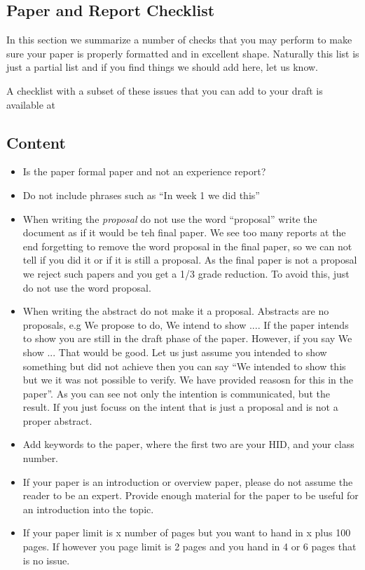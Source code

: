 \subsection{Paper and Report Checklist}\label{paper-checklist}

In this section we summarize a number of checks that you may perform to
make sure your paper is properly formatted and in excellent shape.
Naturally this list is just a partial list and if you find things we
should add here, let us know.

A checklist with a subset of these issues that you can add to your draft is available at


\subsection{Content}

\begin{itemize}[label=$\Box$]
    \item Is the paper formal paper and not an experience report? 
    \item Do not include phrases such as ``In week 1 we did this''
    \item When writing the {\em proposal} do not use the word ``proposal''
      write the document as if it would be teh final paper. We see too
      many reports at the end forgetting to remove the word proposal
      in the final paper, so we can not tell if you did it or if it is
      still a proposal. As the final paper is not a proposal we reject
      such papers and you get a 1/3 grade reduction. To avoid this,
      just do not use the word proposal.
    \item When writing the abstract do not make it a
      proposal. Abstracts are no proposals, e.g We propose to do, We
      intend to show .... If the paper intends to show you are still
      in the draft phase of the paper. However, if you say We show
      ... That would be good. Let us just assume you intended to show
      something but did not achieve then you can say ``We intended to
      show this but we it was not possible to verify. We have provided
      reasosn for this in the paper''. As you can see not only the
      intention is communicated, but the result. If you just focuss on
      the intent that is just a proposal and is not a proper abstract.
    \item Add keywords to the paper, where the first two are your HID,
      and your class number.
    \item If your paper is an introduction or overview paper, please
      do not assume the reader to be an expert. Provide enough
      material for the paper to be useful for an introduction into the
      topic.
    \item If your paper limit is x number of pages but you want to
      hand in x plus 100 pages. If however you page limit is 2 pages
      and you hand in 4 or 6 pages that is no issue.
\end{itemize}


